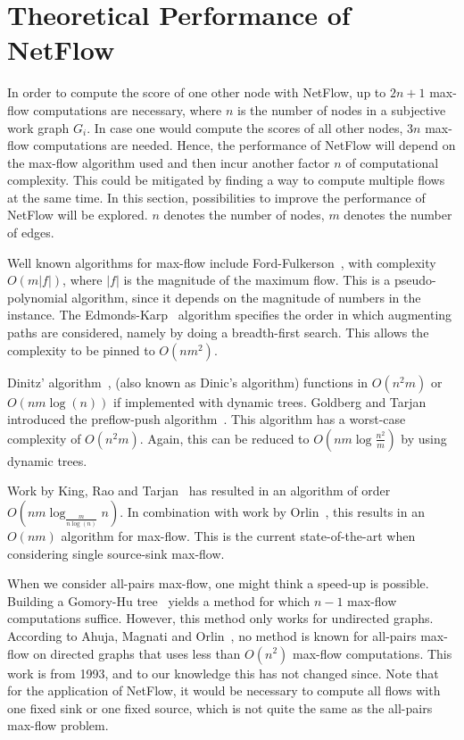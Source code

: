\documentclass[a4paper,11pt]{book}
\theoremstyle{definition}
\begin{document}
\section{Theoretical Performance of NetFlow}

In order to compute the score of one other node with NetFlow, up to $2n+1$ max-flow
computations are necessary, where $n$ is the number of nodes in a subjective work graph $G_i$. 
In case one would compute
the scores of all other nodes, $3n$ max-flow computations are needed. Hence, the
performance of NetFlow will depend on the max-flow algorithm used and then incur
another factor $n$ of computational complexity. This could be mitigated by finding
a way to compute multiple flows at the same time. In this section, possibilities
to improve the performance of NetFlow will be explored. $n$ denotes
the number of nodes, $m$ denotes the number of edges.

Well known algorithms for max-flow include Ford-Fulkerson~\cite{ford1956maximal},
with complexity $O(m|f|)$, where $|f|$ is the magnitude of the maximum flow. This
is a pseudo-polynomial algorithm, since it depends on the magnitude of numbers
in the instance.
The Edmonds-Karp~\cite{edmonds1972theoretical} algorithm specifies the order in which 
augmenting paths are considered, namely by doing a breadth-first search. This allows
the complexity to be pinned to $O(nm^2)$.

Dinitz' algorithm~\cite{dinitz2006dinitz}, (also known as Dinic's algorithm) functions
in $O(n^2m)$ or $O(nm\log(n))$ if implemented with dynamic trees. Goldberg and Tarjan
introduced the preflow-push algorithm~\cite{goldberg1988new}. This algorithm
has a worst-case complexity of $O(n^2m)$. Again, this can be reduced to
$O(nm\log\frac{n^2}{m})$ by using dynamic trees.

Work by King, Rao and Tarjan~\cite{king1992faster} has resulted in an algorithm of
order $O(nm\log_{\frac{m}{n\log(n)}}n)$. In combination with work by Orlin~\cite{orlin2013max},
this results in an $O(nm)$ algorithm for max-flow. This is the current state-of-the-art
when considering single source-sink max-flow.

When we consider all-pairs max-flow, one might think a speed-up is possible. 
Building a Gomory-Hu tree~\cite{gomory1961multi} yields a method
for which $n-1$ max-flow computations suffice. However, this method only works for undirected graphs.
According to Ahuja, Magnati and Orlin~\cite{ahuja1993network}, no method is known for all-pairs max-flow
on directed graphs that uses less than $O(n^2)$ max-flow computations. This work is from
1993, and to our knowledge this has not changed since. Note that for the application of
NetFlow, it would be necessary to compute all flows with one fixed sink or one fixed source,
which is not quite the same as the all-pairs max-flow problem.
\end{document}
